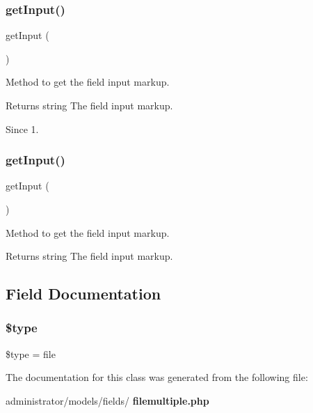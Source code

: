\subsubsection{get\+Input()\hspace{0.1cm}{\footnotesize\ttfamily [1/2]}}
{\footnotesize\ttfamily get\+Input (\begin{DoxyParamCaption}{ }\end{DoxyParamCaption})\hspace{0.3cm}{\ttfamily [protected]}}

Method to get the field input markup.

\begin{DoxyReturn}{Returns}
string The field input markup.
\end{DoxyReturn}
\begin{DoxySince}{Since}
1. 
\end{DoxySince}
\mbox{\label{class_j_form_field_file_multiple_a4380f30ae9202fa49ebd2439572f9cdb}} 
\subsubsection{get\+Input()\hspace{0.1cm}{\footnotesize\ttfamily [2/2]}}
{\footnotesize\ttfamily get\+Input (\begin{DoxyParamCaption}{ }\end{DoxyParamCaption})\hspace{0.3cm}{\ttfamily [protected]}}

Method to get the field input markup.

\begin{DoxyReturn}{Returns}
string The field input markup. 
\end{DoxyReturn}


\subsection{Field Documentation}
\mbox{\label{class_j_form_field_file_multiple_a9a4a6fba2208984cabb3afacadf33919}} 
\subsubsection{\$type}
{\footnotesize\ttfamily \$type = \textquotesingle{}file\textquotesingle{}\hspace{0.3cm}{\ttfamily [protected]}}



The documentation for this class was generated from the following file\+:\begin{DoxyCompactItemize}
\item 
administrator/models/fields/\textbf{ filemultiple.\+php}\end{DoxyCompactItemize}
